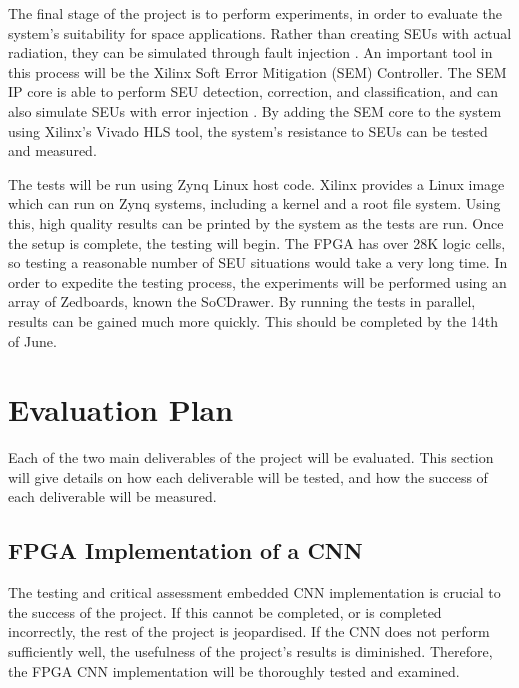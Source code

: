 \documentclass[12pt]{article}
\begin{document}
The final stage of the project is to perform experiments, in order to evaluate the system's suitability for space applications. Rather than creating SEUs with actual radiation, they can be simulated through fault injection \cite{FaultInjection}. An important tool in this process will be the Xilinx Soft Error Mitigation (SEM) Controller. The SEM IP core is able to perform SEU detection, correction, and classification, and can also simulate SEUs with error injection \cite{ManualSEM}. By adding the SEM core to the system using Xilinx's Vivado HLS tool, the system's resistance to SEUs can be tested and measured. 

The tests will be run using Zynq Linux host code. Xilinx provides a Linux image which can run on Zynq systems, including a kernel and a root file system. Using this, high quality results can be printed by the system as the tests are run. Once the setup is complete, the testing will begin. The FPGA has over 28K logic cells, so testing a reasonable number of SEU situations would take a very long time. In order to expedite the testing process, the experiments will be performed using an array of Zedboards, known the SoCDrawer. By running the tests in parallel, results can be gained much more quickly. This should be completed by the 14th of June.

\section{Evaluation Plan}
\label{sec:EvalPlan}
\vspace{-12pt}

Each of the two main deliverables of the project will be evaluated. This section will give details on how each deliverable will be tested, and how the success of each deliverable will be measured.

\subsection{FPGA Implementation of a CNN}
\label{sec:EvalPlan-FPGAImplOfCnn}
\vspace{-12pt}

The testing and critical assessment embedded CNN implementation is crucial to the success of the project. If this cannot be completed, or is completed  incorrectly, the rest of the project is jeopardised. If the CNN does not perform sufficiently well, the usefulness of the project's results is diminished. Therefore, the FPGA CNN implementation will be thoroughly tested and examined.
\end{document}
